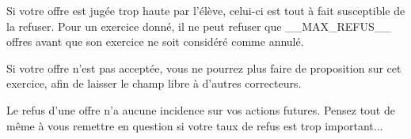﻿Si votre offre est jugée trop haute par l'élève, celui-ci est tout à fait susceptible de la refuser. Pour un exercice donné, il ne peut refuser que __MAX_REFUS__ offres avant que son exercice ne soit considéré comme annulé.

Si votre offre n'est pas acceptée, vous ne pourrez plus faire de proposition sur cet exercice, afin de laisser le champ libre à d'autres correcteurs.

Le refus d'une offre n'a aucune incidence sur vos actions futures. Pensez tout de même à vous remettre en question si votre taux de refus est trop important...